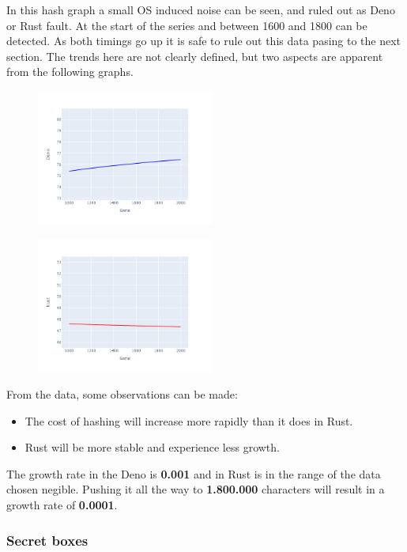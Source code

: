 \documentclass[10pt,journal,compsoc]{IEEEtran}
\begin{document}
In this hash graph a small OS induced noise can be seen, and ruled out as Deno or Rust fault. At the start of the series and between 1600 and 1800 can be detected. As both timings go up it is safe to rule out this data pasing to the next section.
The trends here are not clearly defined, but two aspects are apparent from the following graphs.

\begin{figure}[H]
    \centering
    \includegraphics[width=0.52\textwidth]{trend_hash_deno}
\end{figure}

\begin{figure}[H]
    \centering
    \includegraphics[width=0.52\textwidth]{images/trend_hash_rust.png}
\end{figure}

From the data, some observations can be made:
\begin{itemize}
    \item The cost of hashing will increase more rapidly than it does in Rust.
    \item Rust will be more stable and experience less growth.
\end{itemize}

The growth rate in the Deno is \textbf{0.001} and in Rust is in the range of the data chosen negible. Pushing it all the way to \textbf{1.800.000} characters will result in a growth rate of \textbf{0.0001}.

\subsubsection{Secret boxes}
\end{document}
